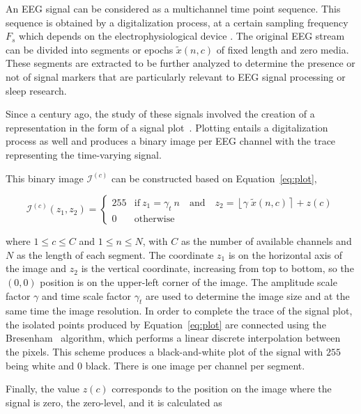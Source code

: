 \documentclass[review]{elsarticle}
\begin{document}
An EEG signal can be considered as a multichannel time point sequence.  This sequence is obtained by a digitalization process, at a certain sampling frequency $F_s$ which depends on the electrophysiological device \cite{Jackson2014}.  The original EEG stream can be divided into segments or epochs $\tilde{x}(n,c) $ of fixed length and zero media.  These segments are extracted to be further analyzed to determine the presence or not of signal markers that are particularly relevant to EEG signal processing or sleep research.

Since a century ago, the study of these signals involved the creation of a representation in the form of a signal plot~\cite{Jestico1977}.  Plotting entails a digitalization process as well and produces a binary image per EEG channel with the trace representing the time-varying signal. 

This binary image $\mathcal{I}^{(c)}$ can be constructed based on Equation~\ref{eq:plot},

\begin{equation}
\mathcal{I}^{(c)}(z_1,z_2) = \left\{ \begin{array}{rl}
255 & \text{if} \   z_1 = \gamma_{t} \  n \quad \text{and}  \quad z_2 = \left\lfloor \gamma \; \tilde{x}(n,c) \right\rceil + z(c) \\
0   & \mbox{otherwise}
\end{array}\right.
\label{eq:plot}
\end{equation}

\noindent  where  $1 \leq c \leq C$ and $1 \leq n \leq N$, with $C$ as the number of available channels and $N$ as the length of each segment.  The coordinate $z_1$ is on the horizontal axis of the image and $z_2$ is the vertical coordinate, increasing from top to bottom, so the $(0,0)$ position is on the upper-left corner of the image.  The amplitude scale factor $\gamma$ and time scale factor $\gamma_{t}$ are used to determine the image size and at the same time the image resolution. In order to complete the trace of the signal plot, the isolated points produced by Equation~\ref{eq:plot} are connected using the Bresenham~\cite{Bresenham1965} algorithm, which performs a linear discrete interpolation between the pixels.  This scheme produces a black-and-white plot of the signal with $255$ being white and $0$ black.  There is one image per channel per segment. 

Finally, the value $z(c)$ corresponds to the position on the image where the signal is zero, the zero-level, and it is calculated as
\end{document}
